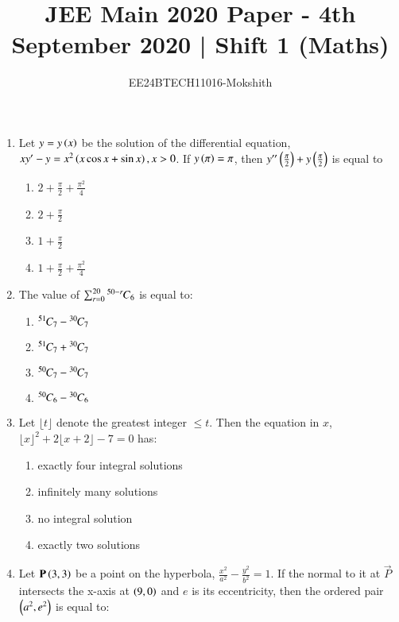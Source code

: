 \documentclass[journal]{IEEEtran}
\begin{document}

\title{JEE Main 2020 Paper - 4th September 2020 | Shift 1 (Maths)}
\author{EE24BTECH11016-Mokshith}
{\let\newpage\relax\maketitle}
\renewcommand{\thefigure}{\theenumi}
\renewcommand{\thetable}{\theenumi}
\setlength{\intextsep}{10pt} %
\renewcommand{\thetable}{\theenumi}

\begin{enumerate}

\item Let $y=y\left(x\right)$ be the solution of the differential equation, $xy^\prime-y=x^2\left(x\cos x+\sin x\right),x>0$. If $y\left(\pi\right)=\pi$, then $y'^\prime\left(\frac{\pi}{2}\right)+y\left(\frac{\pi}{2}\right)$ is equal to
    \begin{enumerate}
    \item $2+\frac{\pi}{2}+\frac{\pi^2}{4}$
    \item $2+\frac{\pi}{2}$
    \item $1+\frac{\pi}{2}$
    \item $1+\frac{\pi}{2}+\frac{\pi^2}{4}$
\end{enumerate}    
    \item The value of $\sum_{r=0}^{20}{{}^{50-r}\mkern-1muC_{6}}$ is equal to:
    \begin{enumerate}
        \item ${{}^{51}\mkern-1muC_{7}}-{{}^{30}\mkern-1muC_{7}}$
        \item ${{}^{51}\mkern-1muC_{7}}+{{}^{30}\mkern-1muC_{7}}$
        \item ${{}^{50}\mkern-1muC_{7}}-{{}^{30}\mkern-1muC_{7}}$
        \item ${{}^{50}\mkern-1muC_{6}}-{{}^{30}\mkern-1muC_{6}}$
    \end{enumerate}
\item Let $\lfloor t\rfloor$ denote the greatest integer $\leq t$. Then the equation in $x$,$\lfloor x\rfloor^2+2\lfloor x+2\rfloor-7=0$ has:
\begin{enumerate}
    \item exactly four integral solutions
    \item infinitely many solutions
    \item no integral solution
    \item exactly two solutions
    \end{enumerate}
\item Let $\mathbf{P}\left(3,3\right)$ be a point on the hyperbola, $\frac{x^2}{a^2}-\frac{y^2}{b^2}=1$. If the normal to it at $\vec{P}$ intersects the x-axis at $\left(9,0\right)$ and $e$ is its eccentricity, then the ordered pair $\left(a^2, e^2\right)$ is equal to:

\end{enumerate}
\end{document}
